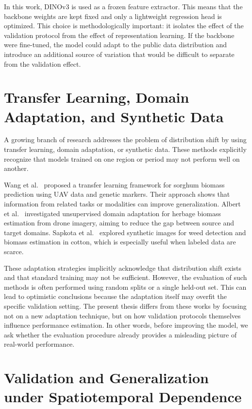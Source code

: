 In this work, DINOv3 is used as a frozen feature extractor. This means that the backbone weights are kept fixed and only a lightweight regression head is optimized. This choice is methodologically important: it isolates the effect of the validation protocol from the effect of representation learning. If the backbone were fine-tuned, the model could adapt to the public data distribution and introduce an additional source of variation that would be difficult to separate from the validation effect.

\section{Transfer Learning, Domain Adaptation, and Synthetic Data}

A growing branch of research addresses the problem of distribution shift by using transfer learning, domain adaptation, or synthetic data. These methods explicitly recognize that models trained on one region or period may not perform well on another.

Wang et al.~\cite{wang2023transfer} proposed a transfer learning framework for sorghum biomass prediction using UAV data and genetic markers. Their approach shows that information from related tasks or modalities can improve generalization. Albert et al.~\cite{albert2022domain} investigated unsupervised domain adaptation for herbage biomass estimation from drone imagery, aiming to reduce the gap between source and target domains. Sapkota et al.~\cite{sapkota2022synthetic} explored synthetic images for weed detection and biomass estimation in cotton, which is especially useful when labeled data are scarce.

These adaptation strategies implicitly acknowledge that distribution shift exists and that standard training may not be sufficient. However, the evaluation of such methods is often performed using random splits or a single held-out set. This can lead to optimistic conclusions because the adaptation itself may overfit the specific validation setting. The present thesis differs from these works by focusing not on a new adaptation technique, but on how validation protocols themselves influence performance estimation. In other words, before improving the model, we ask whether the evaluation procedure already provides a misleading picture of real-world performance.

\section{Validation and Generalization under Spatiotemporal Dependence}

